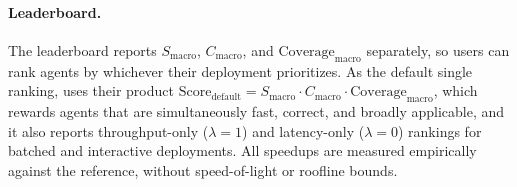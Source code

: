 \paragraph{Leaderboard.}
The leaderboard reports $S_{\mathrm{macro}}$, $C_{\mathrm{macro}}$, and $\mathrm{Coverage}_{\mathrm{macro}}$ separately, so users can rank agents by whichever their deployment prioritizes.
As the default single ranking, \fastkernels{} uses their product $\mathrm{Score}_{\mathrm{default}} = S_{\mathrm{macro}} \cdot C_{\mathrm{macro}} \cdot \mathrm{Coverage}_{\mathrm{macro}}$, which rewards agents that are simultaneously fast, correct, and broadly applicable, and it also reports throughput-only ($\lambda{=}1$) and latency-only ($\lambda{=}0$) rankings for batched and interactive deployments.
All speedups are measured empirically against the reference, without speed-of-light or roofline bounds.
